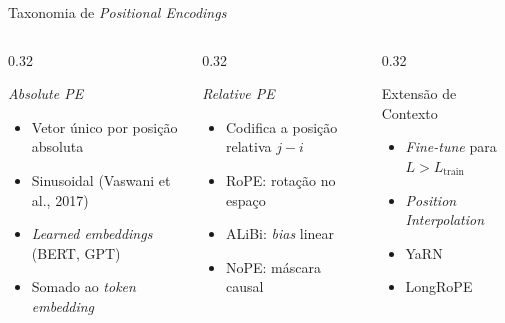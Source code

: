 \documentclass[aspectratio=169, xcolor=dvipsnames]{beamer}
\begin{document}
  \begin{frame}{Taxonomia de \textit{Positional Encodings}}
    \begin{columns}[t]
      \begin{column}{0.32\textwidth}
        \begin{block}{\textit{Absolute PE}}
          \begin{itemize}
            \item Vetor único por posição absoluta
            \item Sinusoidal (Vaswani et al., 2017)
            \item \textit{Learned embeddings} (BERT, GPT)
            \item Somado ao \textit{token embedding}
          \end{itemize}
        \end{block}
      \end{column}
      \begin{column}{0.32\textwidth}
        \begin{block}{\textit{Relative PE}}
          \begin{itemize}
            \item Codifica a posição relativa $j - i$
            \item RoPE: rotação no espaço
            \item ALiBi: \textit{bias} linear
            \item NoPE: máscara causal
          \end{itemize}
        \end{block}
      \end{column}
      \begin{column}{0.32\textwidth}
        \begin{block}{Extensão de Contexto}
          \begin{itemize}
            \item \textit{Fine-tune} para $L > L_{\text{train}}$
            \item \textit{Position Interpolation}
            \item YaRN
            \item LongRoPE
          \end{itemize}
        \end{block}
      \end{column}
    \end{columns}
  \end{frame}
\end{document}
